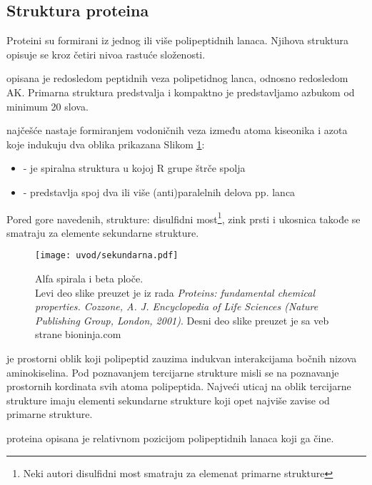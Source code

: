 \subsection{Struktura proteina}

Proteini su formirani iz jednog ili više polipeptidnih lanaca. Njihova struktura
opisuje se kroz četiri nivoa rastuće složenosti.

 opisana je redosledom peptidnih veza polipetidnog
lanca, odnosno redosledom AK.  Primarna struktura predstvalja  i kompaktno je predstavljamo azbukom od minimum 20 slova.

 najčešće nastaje formiranjem vodoničnih veza
između atoma kiseonika i azota koje indukuju dva oblika prikazana Slikom \ref{fig:sekundarna}:
\begin{itemize}
  \item {} - je spiralna struktura u kojoj R grupe štrče spolja
  \item {}  - predstavlja spoj dva ili više (anti)paralelnih delova pp. lanca
\end{itemize}
Pored gore navedenih, strukture: disulfidni most\footnote{Neki autori
disulfidni most smatraju za elemenat primarne strukture}, zink prsti i ukosnica
takođe se smatraju za elemente sekundarne strukture.

\begin{figure}[th]
\centering
\hspace*{-2.0cm} 
\texttt{[image: uvod/sekundarna.pdf]}
\caption {
  Alfa spirala i beta ploče.\\ \footnotesize Levi deo slike preuzet je iz rada
  \textit{Proteins: fundamental chemical properties. Cozzone, A. J.
  Encyclopedia of Life Sciences (Nature Publishing Group, London, 2001)}.
  Desni deo slike preuzet je sa veb strane bioninja.com
}
\label{fig:sekundarna}
\end{figure}


 je prostorni oblik koji polipeptid zauzima indukvan 
interakcijama bočnih nizova aminokiselina.  Pod poznavanjem tercijarne
strukture misli se na poznavanje prostornih kordinata svih atoma polipeptida.
Najveći uticaj na oblik tercijarne strukture imaju elementi sekundarne
strukture koji opet najviše zavise od primarne strukture. 

 proteina opisana je relativnom pozicijom
polipeptidnih lanaca koji ga čine.

